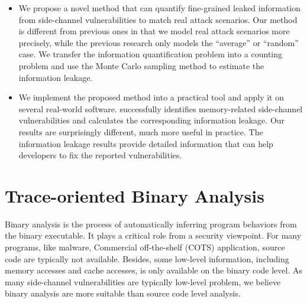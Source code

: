 \begin{itemize}
      \item We propose a novel method that can quantify fine-grained leaked
            information from side-channel vulnerabilities to match real attack
            scenarios. Our method is different from previous ones in that we
            model real attack scenarios more precisely, while the previous
            research only models the ``average'' or ``random'' case. 
            We transfer the information quantification problem into a counting
            problem and use the Monte Carlo sampling method to estimate the
            information leakage.


      \item We implement the proposed method into a practical tool and apply it
            on several real-world software. \tool{} successfully identifies
            memory-related side-channel vulnerabilities and calculates the
            corresponding information leakage. 
            Our results are surprisingly different, much more useful in practice.
            The information leakage results
            provide detailed information that can help developers to fix the
            reported vulnerabilities.
\end{itemize}

\section{Trace-oriented Binary Analysis}
Binary analysis is the process of automatically inferring program behaviors from
the binary executable.
It plays a critical role from a security viewpoint. For many programs, like malware, Commercial off-the-shelf (COTS) application, source code are typically not
available. Besides, some low-level information, including memory accesses and cache
accesses, is only available on the binary code level. As many side-channel vulnerabilities
are typically low-level problem, we believe binary analysis are more suitable than
source code level analysis.

